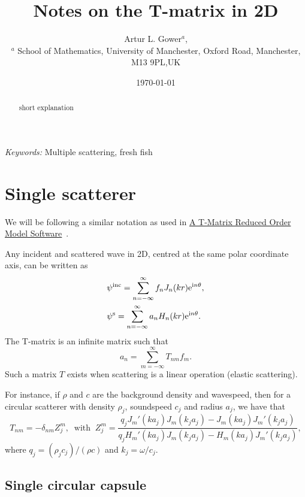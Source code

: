 \documentclass[ 12pt, a4paper]{article}
\begin{document}
\title{Notes on the T-matrix in 2D}
\author{
Artur L. Gower$^{a}$,\\
\footnotesize{$^{a}$ School of Mathematics, University of Manchester, Oxford Road, Manchester, M13 9PL,UK}
}
\date{\today}
\maketitle

\begin{abstract}
short explanation
\end{abstract}

\noindent
{\textit{Keywords:} Multiple scattering, fresh fish}

\section{Single scatterer}

We will be following a similar notation as used in \href{a9-ganesh.pdf}{A T-Matrix Reduced Order
Model Software}~\parencite{ganesh_far-field_2010,ganesh_algorithm_2017}.

Any incident and scattered wave in 2D, centred at the same polar coordinate axis, can be written as
\begin{align}
  & \psi^{\mathrm{inc}} = \sum_{n=-\infty}^\infty f_n J_{n}(k r) \mathrm{e}^{\mathrm{i} n \theta},
  \\
  & \psi^{\mathrm{s}} = \sum_{n=-\infty}^\infty a_n H_{n}(k r) \mathrm{e}^{\mathrm{i} n \theta}.
\end{align}
The T-matrix is an infinite matrix such that
\begin{equation}
  a_n = \sum_{m=-\infty}^\infty T_{nm} f_m.
\end{equation}
Such a matrix $T$ exists when scattering is a linear operation (elastic scattering).

For instance, if $\rho$ and $c$ are the background density and wavespeed, then for a circular scatterer with density $\rho_j$, soundspeed $c_j$ and radius $a_j$, we have that
\begin{equation}
  T_{nm} = - \delta_{nm} Z^m_j, \;\; \text{with} \;\; Z^m_j = \frac{q_j J_m' (k a_j) J_m (k_j a_j) - J_m (k a_j) J_m' (k_j a_j) }{q_j H_m '(k a_j) J_m(k_j a_j) - H_m(k a_j) J_m '(k_j a_j)},
  \label{eqn:circular_t-matrix}
\end{equation}
where $q_j = (\rho_j c_j)/(\rho c)$ and $k_j = \omega/c_j$.

\subsection{Single circular capsule}
\end{document}
